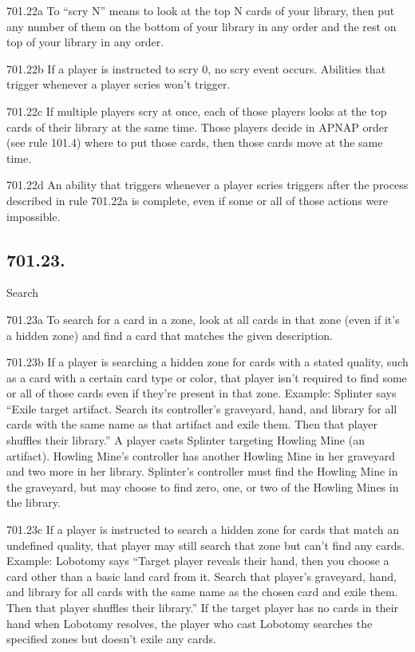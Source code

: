 701.22a To “scry N” means to look at the top N cards of your library, then put any number of them on the bottom of your library in any order and the rest on top of your library in any order.

701.22b If a player is instructed to scry 0, no scry event occurs. Abilities that trigger whenever a player scries won’t trigger.

701.22c If multiple players scry at once, each of those players looks at the top cards of their library at the same time. Those players decide in APNAP order (see rule 101.4) where to put those cards, then those cards move at the same time.

701.22d An ability that triggers whenever a player scries triggers after the process described in rule 701.22a is complete, even if some or all of those actions were impossible.

\subsection*{701.23.}
Search

701.23a To search for a card in a zone, look at all cards in that zone (even if it’s a hidden zone) and find a card that matches the given description.

701.23b If a player is searching a hidden zone for cards with a stated quality, such as a card with a certain card type or color, that player isn’t required to find some or all of those cards even if they’re present in that zone.
Example: Splinter says “Exile target artifact. Search its controller’s graveyard, hand, and library for all cards with the same name as that artifact and exile them. Then that player shuffles their library.” A player casts Splinter targeting Howling Mine (an artifact). Howling Mine’s controller has another Howling Mine in her graveyard and two more in her library. Splinter’s controller must find the Howling Mine in the graveyard, but may choose to find zero, one, or two of the Howling Mines in the library.

701.23c If a player is instructed to search a hidden zone for cards that match an undefined quality, that player may still search that zone but can’t find any cards.
Example: Lobotomy says “Target player reveals their hand, then you choose a card other than a basic land card from it. Search that player’s graveyard, hand, and library for all cards with the same name as the chosen card and exile them. Then that player shuffles their library.” If the target player has no cards in their hand when Lobotomy resolves, the player who cast Lobotomy searches the specified zones but doesn’t exile any cards.


